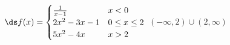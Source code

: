 {$\ds f(x) = \begin{cases} 
\frac{1}{x-1} & x<0 \\
2x^2-3x-1 &0\leq x\leq 2 \\
5x^2-4x & x>2
\end{cases}$}
{$(-\infty, 2)\cup(2,\infty)$}
